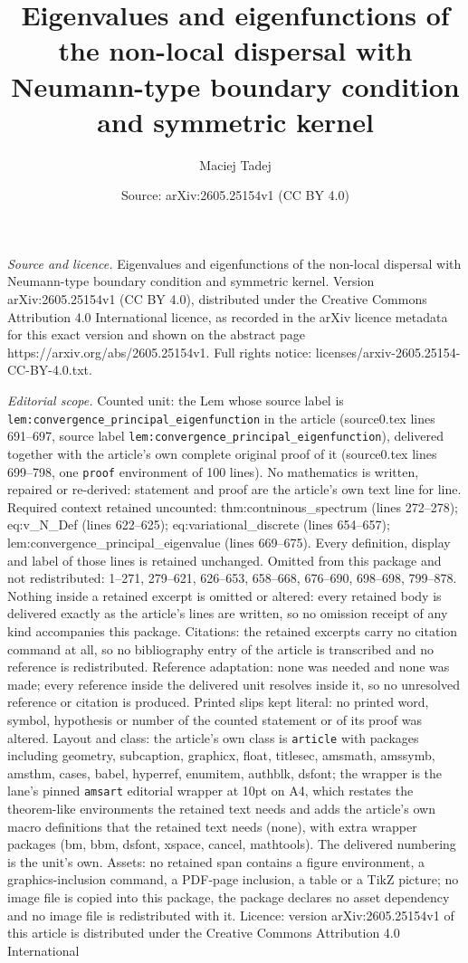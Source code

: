 \documentclass[10pt,a4paper]{amsart}
\title[Eigenvalues and eigenfunctions of the non-local dispersal wi]{Eigenvalues and eigenfunctions of the non-local dispersal with Neumann-type boundary condition and symmetric kernel}
\author{Maciej Tadej}
\date{Source: arXiv:2605.25154v1 (CC BY 4.0)}
\begin{document}
\maketitle

\noindent\emph{Source and licence.} Eigenvalues and eigenfunctions of the non-local dispersal with Neumann-type boundary condition and symmetric kernel. Version arXiv:2605.25154v1 (CC BY 4.0), distributed under the Creative Commons Attribution 4.0 International licence, as recorded in the arXiv licence metadata for this exact version and shown on the abstract page https://arxiv.org/abs/2605.25154v1. Full rights notice: licenses/arxiv-2605.25154-CC-BY-4.0.txt.\par\smallskip

\noindent\textit{Editorial scope.} Counted unit: the Lem whose source label is \texttt{lem:convergence\_principal\_eigenfunction} in the article (source0.tex lines 691--697, source label \texttt{lem:convergence\_principal\_eigenfunction}), delivered together with the article's own complete original proof of it (source0.tex lines 699--798, one \texttt{proof} environment of 100 lines). No mathematics is written, repaired or re-derived: statement and proof are the article's own text line for line. Required context retained uncounted: thm:contninous\_spectrum (lines 272--278); eq:v\_N\_Def (lines 622--625); eq:variational\_discrete (lines 654--657); lem:convergence\_principal\_eigenvalue (lines 669--675). Every definition, display and label of those lines is retained unchanged. Omitted from this package and not redistributed: 1--271, 279--621, 626--653, 658--668, 676--690, 698--698, 799--878. Nothing inside a retained excerpt is omitted or altered: every retained body is delivered exactly as the article's lines are written, so no omission receipt of any kind accompanies this package. Citations: the retained excerpts carry no citation command at all, so no bibliography entry of the article is transcribed and no reference is redistributed. Reference adaptation: none was needed and none was made; every reference inside the delivered unit resolves inside it, so no unresolved reference or citation is produced. Printed slips kept literal: no printed word, symbol, hypothesis or number of the counted statement or of its proof was altered. Layout and class: the article's own class is \texttt{article} with packages including geometry, subcaption, graphicx, float, titlesec, amsmath, amssymb, amsthm, cases, babel, hyperref, enumitem, authblk, dsfont; the wrapper is the lane's pinned \texttt{amsart} editorial wrapper at 10pt on A4, which restates the theorem-like environments the retained text needs and adds the article's own macro definitions that the retained text needs (none), with extra wrapper packages (bm, bbm, dsfont, xspace, cancel, mathtools). The delivered numbering is the unit's own. Assets: no retained span contains a figure environment, a graphics-inclusion command, a PDF-page inclusion, a table or a TikZ picture; no image file is copied into this package, the package declares no asset dependency and no image file is redistributed with it. Licence: version arXiv:2605.25154v1 of this article is distributed under the Creative Commons Attribution 4.0 International 
\end{document}

